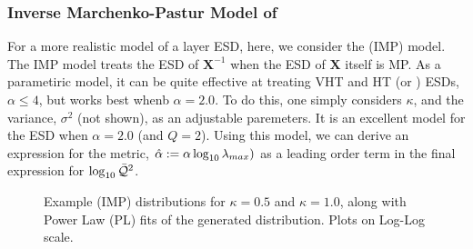 \subsubsection{Inverse Marchenko-Pastur Model of \IdealLearning}
For a more realistic model of a layer ESD, 
here, we consider the \InverseMP (IMP) model.\cite{BunThesis}
The IMP model treats the ESD of $\mathbf{X}^{-1}$ when the ESD of $\mathbf{X}$ itself is MP.
As a parametiric model, it can be quite effective at treating VHT and HT (or \FatTailed) ESDs,
$\alpha\le 4$, but works best whenb $\alpha=2.0$.
To do this, one simply considers  $\kappa$, and the variance, $\sigma^2$ (not shown), as an adjustable paremeters.
%
It is an excellent model for the ESD when $\alpha=2.0$ (and $Q=2$).
Using this model, we can derive an expression for the \HTSR \ALPHAHAT \LayerQuality metric,
$\hat\alpha :=\alpha\log_{10}\lambda_{max})$ as a leading order term in the final expression for $\log_{10}\bar{\mathcal{Q}}^{2}$.

\begin{figure}[h]
    \centering
      \caption{Example \InverseMP (IMP) distributions for $\kappa=0.5$ and $\kappa=1.0$,  along with Power Law (PL) fits of the generated distribution. Plots on Log-Log scale.}
  \label{fig:IMPplots}                                                                                                      
\end{figure}   

